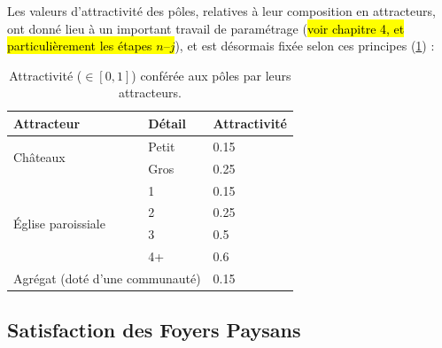 Les valeurs d'attractivité des pôles, relatives à leur composition en attracteurs, ont donné lieu à un important travail de paramétrage (\hl{voir chapitre 4, et particulièrement les étapes $n$--$j$}), et est désormais fixée selon ces principes (\cref{tab:attraction-poles}) :

\begin{table}[H]
	\centering
	{\renewcommand{\arraystretch}{1.2}%
	\begin{tabular}{|l|l|l|}\hline
		\textbf{Attracteur} & \textbf{Détail} & \textbf{Attractivité} \\ \hline
		\multirow{2}{*}{Châteaux} & Petit & 0.15 \\
		& Gros & 0.25 \\ \hline
		\multirow{4}{*}{Église paroissiale} & 1 & 0.15 \\
		& 2 & 0.25 \\
		& 3 & 0.5 \\
		& 4+ & 0.6 \\ \hline
		\multicolumn{2}{|l|}{Agrégat (doté d'une communauté)} & 0.15 \\ \hline
	\end{tabular}}
	\caption{Attractivité ($\in [0,1]$) conférée aux pôles par leurs attracteurs.}
	\label{tab:attraction-poles}
\end{table}

\subsection{Satisfaction des Foyers Paysans}

